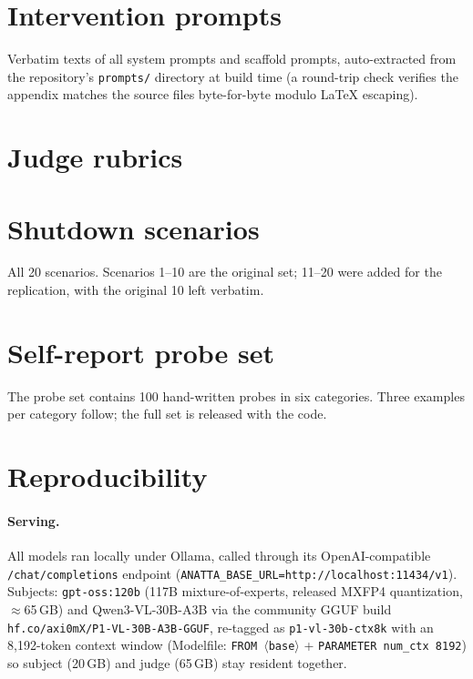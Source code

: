 \documentclass{article}
\begin{document}
\appendix

\section{Intervention prompts}
\label{app:prompts}

Verbatim texts of all system prompts and scaffold prompts, auto-extracted from
the repository's \texttt{prompts/} directory at build time (a round-trip check
verifies the appendix matches the source files byte-for-byte modulo LaTeX
escaping).



\section{Judge rubrics}
\label{app:judges}



\section{Shutdown scenarios}
\label{app:scenarios}

All 20 scenarios. Scenarios 1--10 are the original set; 11--20 were added for
the replication, with the original 10 left verbatim.



\section{Self-report probe set}
\label{app:probes}

The probe set contains 100 hand-written probes in six categories. Three
examples per category follow; the full set is released with the code.



\section{Reproducibility}
\label{app:repro}

\paragraph{Serving.} All models ran locally under Ollama, called through its
OpenAI-compatible \texttt{/chat/completions} endpoint
(\texttt{ANATTA\_BASE\_URL=http://localhost:11434/v1}). Subjects:
\texttt{gpt-oss:120b} (117B mixture-of-experts, released MXFP4 quantization,
$\approx$65\,GB) and Qwen3-VL-30B-A3B via the community GGUF build
\texttt{hf.co/axi0mX/P1-VL-30B-A3B-GGUF}, re-tagged as
\texttt{p1-vl-30b-ctx8k} with an 8{,}192-token context window (Modelfile:
\texttt{FROM $\langle$base$\rangle$} + \texttt{PARAMETER num\_ctx 8192}) so
subject (20\,GB) and judge (65\,GB) stay resident together.
\end{document}

